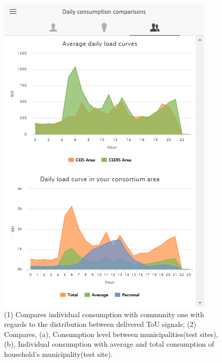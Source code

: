 \begin{figure}[htb]
\begin{center}
\begin{minipage}[htb]{0.33\linewidth}
         \includegraphics[width=1\linewidth]{img/benchmark.png}
        \end{minipage}
      \end{center}
      \caption{(1) Compares individual consumption with community one with regards to the distribution between delivered ToU signals; (2) Compares, (a), Consumption level between municipalities(test sites), (b), Individual consumption with average and total consumption of household's municipality(test site).
}
\label{fig:comparison}
\end{figure}

